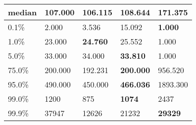 \begin{table}[H]
\begin{tabular}{|l|m{10em}|m{10em}|m{10em}|m{10em}|}
\hline median & 107.000 & \bfseries 106.115 & 108.644 & \cellcolor[rgb]{0.9, 0.54, 0.52} 171.375 \\
\hline 0.1\% & 2.000 & 3.536 & \cellcolor[rgb]{0.9, 0.54, 0.52} 15.092 & \bfseries 1.000 \\
\hline 1.0\% & 23.000 & \bfseries 24.760 & 25.552 & \cellcolor[rgb]{0.9, 0.54, 0.52} 1.000 \\
\hline 5.0\% & 33.000 & 34.000 & \bfseries 33.810 & \cellcolor[rgb]{0.9, 0.54, 0.52} 1.000 \\
\hline 75.0\% & 200.000 & 192.231 & \bfseries 200.000 & \cellcolor[rgb]{0.9, 0.54, 0.52} 956.520 \\
\hline 95.0\% & 490.000 & 450.000 & \bfseries 466.036 & \cellcolor[rgb]{0.9, 0.54, 0.52} 1893.300 \\
\hline 99.0\% & 1200 & 875 & \bfseries 1074 & \cellcolor[rgb]{0.9, 0.54, 0.52} 2437 \\
\hline 99.9\% & 37947 & \cellcolor[rgb]{0.9, 0.54, 0.52} 12626 & 21232 & \bfseries 29329 \\
\hline
\end{tabular}
\end{table}
